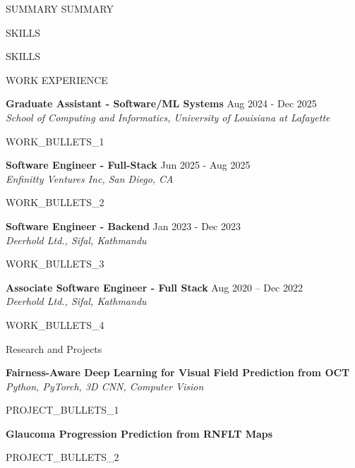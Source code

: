 \documentclass{resume}
\begin{document}
\vspace{-8pt}
\begin{rSection}{SUMMARY}
{{SUMMARY}}
\end{rSection}

\vspace{-7pt}
\begin{rSection}{SKILLS}

\begin{itemize}
{{SKILLS}}

\end{itemize}

\end{rSection}

\vspace{-5pt}
\begin{rSection}{WORK EXPERIENCE}

\textbf{Graduate Assistant - Software/ML Systems} \hfill Aug 2024 - Dec 2025\\
\textit{School of Computing and Informatics, University of Louisiana at Lafayette}

\begin{itemize}
{{WORK_BULLETS_1}}
\end{itemize}

\textbf{Software Engineer - Full-Stack} \hfill Jun 2025 - Aug 2025\\
\textit{Enfinitty Ventures Inc, San Diego, CA}

\begin{itemize}
{{WORK_BULLETS_2}}
\end{itemize}

\textbf{Software Engineer - Backend} \hfill Jan 2023 - Dec 2023 \\
\textit{Deerhold Ltd., Sifal, Kathmandu}

\begin{itemize}
{{WORK_BULLETS_3}}
\end{itemize}

\textbf{Associate Software Engineer - Full Stack} \hfill Aug 2020 – Dec 2022 \\
\textit{Deerhold Ltd., Sifal, Kathmandu}

\begin{itemize}
{{WORK_BULLETS_4}}
\end{itemize}

\end{rSection}

\vspace{-5pt}
\begin{rSection}{Research and Projects}

\textbf{Fairness-Aware Deep Learning for Visual Field Prediction from OCT} \\
\textit{Python, PyTorch, 3D CNN, Computer Vision}

\begin{itemize}
{{PROJECT_BULLETS_1}}
\end{itemize}

\textbf{Glaucoma Progression Prediction from RNFLT Maps}

\begin{itemize}
{{PROJECT_BULLETS_2}}
\end{itemize}

\end{rSection}
\end{document}

